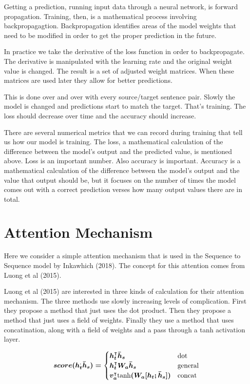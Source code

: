 Getting a prediction, running input data through a neural network, is forward propagation.
Training, then, is a mathematical process involving backpropagagtion. Backpropagation identifies areas of the model weights that need to be modified in order to get the proper prediction in the future.

In practice we take the derivative of the loss function in order to backpropagate. The derivative is manipulated with the learning rate and the original weight value is changed. The result is a set of adjusted weight matrices. When these matrices are used later they allow for better predictions. 

This is done over and over with every source/target sentence pair. Slowly the model is changed and predictions start to match the target. That's training. The loss should decrease over time and the accuracy should increase.

There are several numerical metrics that we can record during training that tell us how our model is training. The loss, a mathematical calculation of the difference between the model's output and the predicted value, is mentioned above. Loss is an important number. Also accuracy is important. Accuracy is a mathematical calculation of the difference between the model's output and the value that output should be, but it focuses on the number of times the model comes out with a correct prediction verses how many output values there are in total.

\section{Attention Mechanism}

Here we consider a simple attention mechanism that is used in the Sequence to Sequence model by Inkawhich (2018)\cite{2018Inkawhich}. The concept for this attention comes from Luong et al (2015)\cite{DBLP:journals/corr/LuongPM15}.

Luong et al (2015)\cite{DBLP:journals/corr/LuongPM15} are interested in three kinds of calculation for their attention mechanism. The three methods use slowly increasing levels of complication. First they propose a method that just uses the dot product. Then they propose a method that just uses a field of weights. Finally they use a method that uses concatination, along with a field of weights and a pass through a tanh activation layer.

$$
\boldmath
score(h_t^ \text{,} \bar{h}_s) =
\begin{cases}
    h_t^\intercal \bar{h}_s & \text{dot} \\
	h_t^\intercal W_a \bar{h}_s & \text{general} \\
	v_a^\intercal \text{tanh}(W_a [h_t ; \bar{h}_s] ) & \text{concat}
\end{cases}
\unboldmath
$$

